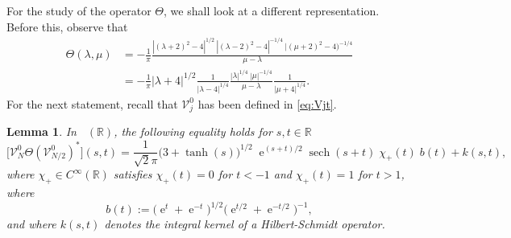 \documentclass[11pt]{article}
\def\R{\mathbb R}
\def\V{\mathcal V}
\def\e{\mathop{\mathrm{e}}\nolimits}
\def\ltwo{\mathop{\mathrm{L}^2}\nolimits}
\def\sech{\mathop{\mathrm{sech}}\nolimits}
\newtheorem{Lemma}[Theorem]{Lemma}
\begin{document}
For the study of the operator $\Theta$, we shall look at a different representation.
Before this, observe that
\begin{align*}
\Theta(\lambda,\mu)
& =  -\frac{1}{\pi}\frac{|(\lambda+2)^2-4|^{1/2}\ |(\lambda-2)^2-4|^{-1/4}\ 
|(\mu+2)^2-4)^{-1/4}}{\mu-\lambda} \\
& = -\frac{1}{\pi} |\lambda+4|^{1/2}\frac{1}{|\lambda-4|^{1/4}}
\frac{|\lambda|^{1/4}\ |\mu|^{-1/4}}{\mu-\lambda} \frac{1}{|\mu+4|^{1/4}}.
\end{align*}
For the next statement, recall that $\V_j^0$ has been defined in \eqref{eq:Vjt}.

\begin{Lemma}
In $\ltwo(\R)$, the following equality holds for $s,t\in \R$
$$
\big[\V^0_N \Theta(\V^0_{N/2})^*\big](s,t)=
\frac{1}{\sqrt{2}\pi}\big(3+\tanh(s)\big)^{1/2}\;\!
\e^{(s+t)/2}\sech(s+t)\;\! \chi_+(t)\;\! b(t) + k(s,t),
$$
where $\chi_+\in C^\infty(\R)$ satisfies $\chi_+(t)=0$ for $t<-1$ and $\chi_+(t)=1$ for $t>1$, 
where
$$
b(t):=\big(\e^t+\e^{-t}\big)^{1/2}\big(\e^{t/2}+\e^{-t/2}\big)^{-1},
$$
and where $k(s,t)$ denotes the integral kernel of a Hilbert-Schmidt operator.
\end{Lemma}
\end{document}
